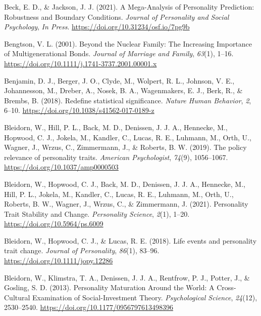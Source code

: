 \documentclass[
  english,
  man, noextraspace]{apa7}
\begin{document}
\leavevmode\hypertarget{ref-beckMegaAnalysisPersonalityPrediction2021}{}%
Beck, E. D., \& Jackson, J. J. (2021). A Mega-Analysis of Personality Prediction: Robustness and Boundary Conditions. \emph{Journal of Personality and Social Psychology}, \emph{In Press}. \url{https://doi.org/10.31234/osf.io/7pg9b}

\leavevmode\hypertarget{ref-bengtsonNuclearFamilyIncreasing2001}{}%
Bengtson, V. L. (2001). Beyond the Nuclear Family: The Increasing Importance of Multigenerational Bonds. \emph{Journal of Marriage and Family}, \emph{63}(1), 1--16. \url{https://doi.org/10.1111/j.1741-3737.2001.00001.x}

\leavevmode\hypertarget{ref-benjaminRedefineStatisticalSignificance2018}{}%
Benjamin, D. J., Berger, J. O., Clyde, M., Wolpert, R. L., Johnson, V. E., Johannesson, M., Dreber, A., Nosek, B. A., Wagenmakers, E. J., Berk, R., \& Brembs, B. (2018). Redefine statistical significance. \emph{Nature Human Behavior}, \emph{2}, 6--10. \url{https://doi.org/10.1038/s41562-017-0189-z}

\leavevmode\hypertarget{ref-bleidornPolicyRelevancePersonality2019}{}%
Bleidorn, W., Hill, P. L., Back, M. D., Denissen, J. J. A., Hennecke, M., Hopwood, C. J., Jokela, M., Kandler, C., Lucas, R. E., Luhmann, M., Orth, U., Wagner, J., Wrzus, C., Zimmermann, J., \& Roberts, B. W. (2019). The policy relevance of personality traits. \emph{American Psychologist}, \emph{74}(9), 1056--1067. \url{https://doi.org/10.1037/amp0000503}

\leavevmode\hypertarget{ref-bleidornPersonalityTraitStability2021}{}%
Bleidorn, W., Hopwood, C. J., Back, M. D., Denissen, J. J. A., Hennecke, M., Hill, P. L., Jokela, M., Kandler, C., Lucas, R. E., Luhmann, M., Orth, U., Roberts, B. W., Wagner, J., Wrzus, C., \& Zimmermann, J. (2021). Personality Trait Stability and Change. \emph{Personality Science}, \emph{2}(1), 1--20. \url{https://doi.org/10.5964/ps.6009}

\leavevmode\hypertarget{ref-bleidornLifeEventsPersonality2018}{}%
Bleidorn, W., Hopwood, C. J., \& Lucas, R. E. (2018). Life events and personality trait change. \emph{Journal of Personality}, \emph{86}(1), 83--96. \url{https://doi.org/10.1111/jopy.12286}

\leavevmode\hypertarget{ref-bleidornPersonalityMaturationWorld2013}{}%
Bleidorn, W., Klimstra, T. A., Denissen, J. J. A., Rentfrow, P. J., Potter, J., \& Gosling, S. D. (2013). Personality Maturation Around the World: A Cross-Cultural Examination of Social-Investment Theory. \emph{Psychological Science}, \emph{24}(12), 2530--2540. \url{https://doi.org/10.1177/0956797613498396}
\end{document}
